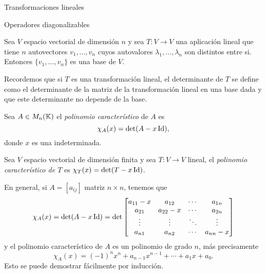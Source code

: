 \begin{chapter}{Transformaciones lineales}
\begin{section}{Operadores diagonalizables}
        \begin{corolario}\label{cor-aut-li}
            Sea $V$ espacio vectorial de dimensión $n$ y sea $T: V \to V$ una aplicación lineal que tiene $n$
            autovectores $v_1,\ldots, v_n$ cuyos autovalores $\lambda_1,\ldots,\lambda_n$ son distintos entre
            si. Entonces $\{v_1,\ldots, v_n\}$ es una base de $V$.
        \end{corolario}
        
        Recordemos que si $T$  es una transformación lineal, el determinante de $T$  se define como el determinante de la matriz de la transformación lineal en una base dada y que este determinante no depende de la base.    
        
        \begin{definicion}
            Sea $A \in M_n(\mathbb K)$   el \textit{polinomio característico} de $A$ es $$\chi_A(x) = \det(A-x \operatorname{Id}),$$ donde $x$ es una indeterminada. 
            
            Sea $V$ espacio vectorial de dimensión finita y sea $T: V \to V$ lineal, el  \textit{polinomio característico de $T$} es $\chi_T(x) = \det(T- x \operatorname{Id})$.
        \end{definicion}
    
            
        En general,  si $A = [a_{ij}]$ matriz $n \times n$, tenemos que
        \begin{equation}
        \chi_A(x) = \det(A- x\operatorname{Id}) = \det
        \begin{bmatrix}
        a_{11}-x&a_{12}&\cdots&a_{1n}\\
        a_{21}&a_{22}-x&\cdots&a_{2n}\\
        \vdots&\vdots&\ddots&\vdots\\
        a_{n1}&a_{n2}&\cdots&a_{nn}-x\\
        \end{bmatrix}
        \end{equation} 
        y el polinomio característico de $A$ es un polinomio  de grado $n$,  más precisamente  
        $$
        \chi_A(x) =(-1)^nx^n + a_{n-1}x^{n-1}+ \cdots + a_1x + a_0.
        $$ 
        Esto se puede demostrar fácilmente por inducción. 
        

\end{section}
\end{chapter}
